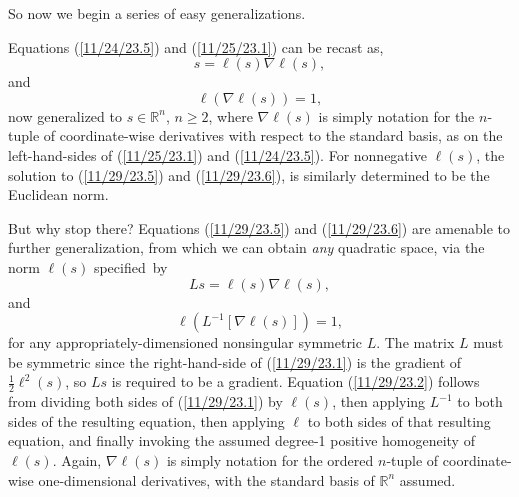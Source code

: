 \documentclass{amsart}
\numberwithin{equation}{section}
\theoremstyle{definition}
\numberwithin{theorem}{section}
\begin{document}
  
So now we begin a series of easy generalizations.  

Equations (\ref{11/24/23.5}) and (\ref{11/25/23.1}) can be recast as, \begin{equation}\label{11/29/23.5} s = \ell(s)\nabla\ell(s),\end{equation} and\begin{equation}\label{11/29/23.6}\ell\left(\nabla\ell(s)\right) = 1,\end{equation} now generalized to $s\in \mathbb{R}^n$, $n\ge 2$, where $\nabla\ell(s)$ is simply notation for the $n$-tuple of coordinate-wise derivatives with respect to the standard basis, as on the left-hand-sides of  (\ref{11/25/23.1}) and (\ref{11/24/23.5}).  For nonnegative $\ell(s)$, the solution to (\ref{11/29/23.5}) and (\ref{11/29/23.6}), is similarly determined to be the Euclidean norm.  

But why stop there?  Equations (\ref{11/29/23.5}) and (\ref{11/29/23.6}) are amenable to further generalization, from which  we can obtain {\it any} quadratic space, via the norm $\ell(s)$ \mbox{specified by} \begin{equation}\label{11/29/23.1} Ls = \ell(s)\nabla\ell(s),\end{equation} and \begin{equation}\label{11/29/23.2}\ell\left(L^{-1}[\nabla\ell(s)]\right) = 1,\end{equation} for any appropriately-dimensioned nonsingular symmetric $L$.  The matrix $L$ must be symmetric since the right-hand-side of (\ref{11/29/23.1}) is the gradient of $\frac{1}{2}\ell^2(s)$, so $Ls$ is required to be a gradient.  Equation (\ref{11/29/23.2}) follows from dividing both sides of (\ref{11/29/23.1}) by $\ell(s)$, then applying $L^{-1}$ to both sides of the resulting equation, then applying $\ell$ to both sides of that resulting equation, and finally invoking the assumed degree-1 positive homogeneity of $\ell(s)$. Again,  $\nabla\ell(s)$ is simply notation for the ordered $n$-tuple of  coordinate-wise one-dimensional derivatives, with the standard basis of $\mathbb{R}^n$ assumed.
  
\end{document}
